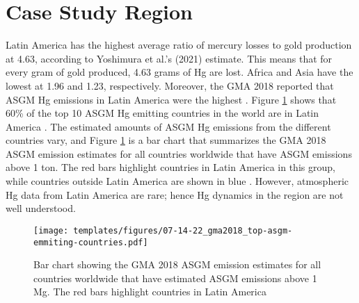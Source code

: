\section{Case Study Region}
\begin{flushleft}
Latin America has the highest average ratio of mercury losses to gold production at 4.63, according to Yoshimura et al.'s (2021) estimate. This means that for every gram of gold produced, 4.63 grams of Hg are lost. Africa and Asia have the lowest at 1.96 and 1.23, respectively. Moreover, the GMA 2018 reported that ASGM Hg emissions in Latin America were the highest \cite{united_nations_environment_programme_technical_2019}. Figure \ref{fig:global_asgm_emissions_above_a_tone_barchart} shows that 60\% of the top 10 ASGM Hg emitting countries in the world are in Latin America  \cite{united_nations_environment_programme_technical_2019}. The estimated amounts of ASGM Hg emissions from the different countries vary, and Figure \ref{fig:global_asgm_emissions_above_a_tone_barchart} is a bar chart that summarizes the GMA 2018 ASGM \hg emission estimates for all countries worldwide that have ASGM \hg emissions above 1 ton. The red bars highlight countries in Latin America in this group, while countries outside Latin America are shown in blue  \cite{united_nations_environment_programme_technical_2019}. However, atmospheric Hg data from Latin America are rare; hence Hg dynamics in the region are not well understood. 
\end{flushleft}

\begin{figure}[H]
  \texttt{[image: templates/figures/07-14-22\_gma2018\_top-asgm-emmiting-countries.pdf]}
  \centering
  \caption{Bar chart showing the GMA 2018 ASGM \hg emission estimates for all countries worldwide that have estimated ASGM \hg emissions above 1 Mg. The red bars highlight countries in Latin America \cite{united_nations_environment_programme_technical_2019}}
  \label{fig:global_asgm_emissions_above_a_tone_barchart}
\end{figure}
\FloatBarrier

